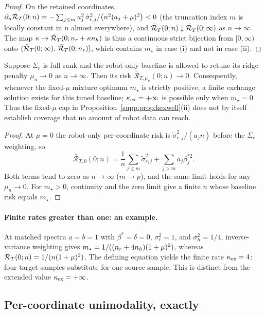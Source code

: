 \begin{proof}
On the retained coordinates, $\partial_n \bar{\mathcal{R}}_T(0; n) = -\sum_{j \le m} a_j^2\, \tilde\sigma_{r,j}^2 / \big(n^2 (a_j + \mu)^2\big) < 0$ (the truncation index $m$ is locally constant in $n$ almost everywhere), and $\bar{\mathcal{R}}_T(0; n) \downarrow \bar{\mathcal{R}}_T(0; \infty)$ as $n \to \infty$.
The map $\kappa \mapsto \bar{\mathcal{R}}_T(0; n_r + \kappa n_h)$ is thus a continuous strict bijection from $[0, \infty)$ onto $(\bar{\mathcal{R}}_T(0; \infty),\, \bar{\mathcal{R}}_T(0; n_r)]$, which contains $m_\star$ in case (i) and not in case (ii).
\end{proof}

\begin{proposition}
\label{supp:prop:tunedbaseline}
Suppose $\Sigma_r$ is full rank and the robot-only baseline is allowed to retune its ridge penalty $\mu_n\to0$ as $n\to\infty$.
Then its risk $\bar{\mathcal R}_{T,\mu_n}(0;n)\to0$.
Consequently, whenever the fixed-$\mu$ mixture optimum $m_\star$ is strictly positive, a finite exchange solution exists for this tuned baseline; $\kappa_{\mathrm{ex}}=+\infty$ is possible only when $m_\star=0$.
Thus the fixed-$\mu$ cap in Proposition~\ref{supp:prop:kexwell}(ii) does not by itself establish coverage that no amount of robot data can reach.
\end{proposition}

\begin{proof}
At $\mu=0$ the robot-only per-coordinate risk is $\tilde\sigma_{r,j}^2/(a_j n)$ before the $\Sigma_r$ weighting, so
\[
\bar{\mathcal R}_{T,0}(0;n)=\frac1n\sum_{j\le m}\tilde\sigma_{r,j}^2+\sum_{j>m}a_j\beta_j^{*2}.
\]
Both terms tend to zero as $n\to\infty$ ($m\to p$), and the same limit holds for any $\mu_n\to0$.
For $m_\star>0$, continuity and the zero limit give a finite $n$ whose baseline risk equals $m_\star$.
\end{proof}

\paragraph{Finite rates greater than one: an example.}
At matched spectra $a=b=1$ with $\beta^*=\delta=0$, $\sigma_r^2=1$, and $\sigma_h^2=1/4$, inverse-variance weighting gives $m_\star=1/((n_r+4n_h)(1+\mu)^2)$, whereas $\bar{\mathcal{R}}_T(0;n)=1/(n(1+\mu)^2)$.
The defining equation yields the finite rate $\kappa_{\mathrm{ex}}=4$: four target samples substitute for one source sample.
This is distinct from the extended value $\kappa_{\mathrm{ex}}=+\infty$.

\subsection{Per-coordinate unimodality, exactly}

